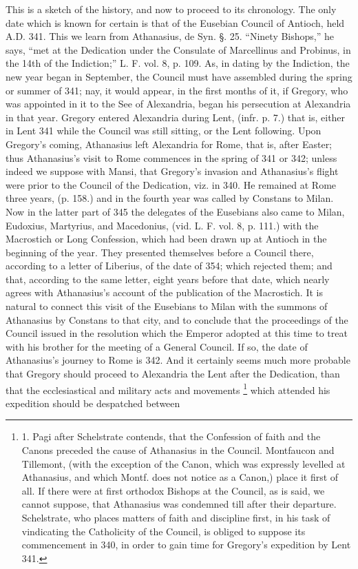 This is a sketch of the
history, and now to proceed to its chronology. The only date which is
known for certain is that of the Eusebian Council of Antioch, held A.D. 341. This
we learn from Athanasius, de Syn. §. 25. “Ninety Bishops,” he
says, “met at the Dedication under the Consulate of Marcellinus and
Probinus, in the 14th of the Indiction;” L. F. vol. 8, p. 109. As,
in dating by the Indiction, the new year began in September, the
Council must have assembled during the spring or summer of 341; nay,
it would appear, in the first months of it, if Gregory, who was
appointed in it to the See of Alexandria, began his persecution at
Alexandria in that year. Gregory entered Alexandria during Lent, (infr.
p. 7.) that is, either in Lent 341 while the Council was still
sitting, or the Lent following. Upon Gregory's coming, Athanasius left
Alexandria for Rome, that is, after Easter; thus Athanasius's visit to
Rome commences in the spring of 341 or 342; unless indeed we suppose
with Mansi, that Gregory's invasion and Athanasius's flight were prior
to the Council of the Dedication, viz. in 340. He remained at Rome
three years, (p. 158.) and in the fourth year was called by Constans
to Milan. Now in the latter part of 345 the delegates of the Eusebians
also came to Milan, Eudoxius, Martyrius, and Macedonius, (vid. L. F.
vol. 8, p. 111.) with the Macrostich or Long Confession, which had
been drawn up at Antioch in the beginning of the year. They presented
themselves before a Council there, according to a letter of Liberius,
of the date of 354; which rejected them; and that, according to the
same letter, eight years before that date, which nearly agrees with
Athanasius's account of the publication of the Macrostich. It is
natural to connect this visit of the Eusebians to Milan with the
summons of Athanasius by Constans to that city, and to conclude that
the proceedings of the Council issued in the resolution which the
Emperor adopted at this time to treat with his brother for the meeting
of a General Council. If so, the date of Athanasius's journey to Rome
is 342. And it certainly seems much more probable that Gregory should
proceed to Alexandria the Lent after the Dedication, than that the
ecclesiastical and military acts and movements \footnote{1. Pagi after Schelstrate
contends, that the Confession of faith and the Canons preceded the
cause of Athanasius in the Council. Montfaucon and Tillemont, (with
the exception of the Canon, which was expressly levelled at Athanasius,
and which Montf. does not notice as a Canon,) place it first of all.
If there were at first orthodox Bishops at the Council, as is said, we
cannot suppose, that Athanasius was condemned till after their
departure. Schelstrate, who places matters of faith and discipline
first, in his task of vindicating the Catholicity of the Council, is
obliged to suppose its commencement in 340, in order to gain time for
Gregory's expedition by Lent 341.} which attended his expedition should be despatched between
